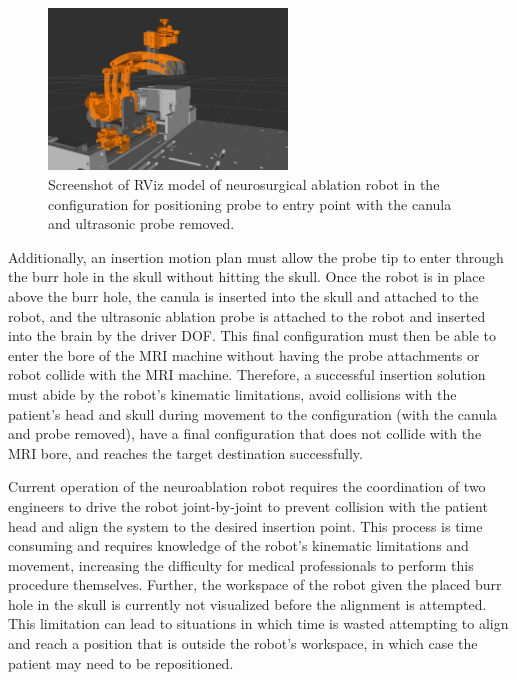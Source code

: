 \documentclass[12pt]{report}
\begin{document}
\begin{figure}[thpb]
	\centering
	\includegraphics[width = 2.5in]{images/neuro_no_probe.png}
    \caption{Screenshot of RViz model of neurosurgical ablation robot in the configuration for positioning probe to entry point with the canula and ultrasonic probe removed. }
    \label{fig:neuroRVizModelNoProbe}
\end{figure}

Additionally, an insertion motion plan must allow the probe tip to enter through the burr hole in the skull without hitting the skull. Once the robot is in place above the burr hole, the canula is inserted into the skull and attached to the robot, and the ultrasonic ablation probe is attached to the robot and inserted into the brain by the driver DOF. This final configuration must then be able to enter the bore of the MRI machine without having the probe attachments or robot collide with the MRI machine. Therefore, a successful insertion solution must abide by the robot’s kinematic limitations, avoid collisions with the patient’s head and skull during movement to the configuration (with the canula and probe removed), have a final configuration that does not collide with the MRI bore, and reaches the target destination successfully.

Current operation of the neuroablation robot requires the coordination of two engineers to drive the robot joint-by-joint to prevent collision with the patient head and align the system to the desired insertion point. This process is time consuming and requires knowledge of the robot’s kinematic limitations and movement, increasing the difficulty for medical professionals to perform this procedure themselves. Further, the workspace of the robot given the placed burr hole in the skull is currently not visualized before the alignment is attempted. This limitation can lead to situations in which time is wasted attempting to align and reach a position that is outside the robot’s workspace, in which case the patient may need to be repositioned.

\end{document}
